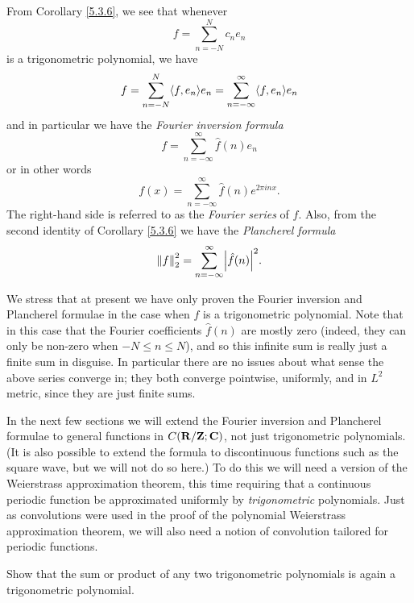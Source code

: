 \begin{additional corollary}\label{ac 5.3.1}
From Corollary \ref{5.3.6}, we see that whenever
\[
    f = \sum_{n = -N}^N c_n e_n
\]
is a trigonometric polynomial, we have
\[
    f = \sum_{n = -N}^N \inner*{f, e_n} e_n = \sum_{n = -\infty}^\infty \inner*{f, e_n} e_n
\]
and in particular we have the \emph{Fourier inversion formula}
\[
    f = \sum_{n = -\infty}^\infty \hat{f}(n) e_n
\]
or in other words
\[
    f(x) = \sum_{n = -\infty}^\infty \hat{f}(n) e^{2 \pi i n x}.
\]
The right-hand side is referred to as the \emph{Fourier series} of \(f\).
Also, from the second identity of Corollary \ref{5.3.6} we have the \emph{Plancherel formula}
\[
    \norm*{f}_2^2 = \sum_{n = -\infty}^\infty \abs{\hat{f}(n)}^2.
\]
\end{additional corollary}

\begin{remark}\label{5.3.8}
    We stress that at present we have only proven the Fourier inversion and Plancherel formulae in the case when \(f\) is a trigonometric polynomial.
    Note that in this case that the Fourier coefficients \(\hat{f}(n)\) are mostly zero (indeed, they can only be non-zero when \(-N \leq n \leq N\)), and so this infinite sum is really just a finite sum in disguise.
    In particular there are no issues about what sense the above series converge in;
    they both converge pointwise, uniformly, and in \(L^2\) metric, since they are just finite sums.
\end{remark}

\begin{note}
    In the next few sections we will extend the Fourier inversion and Plancherel formulae to general functions in \(C(\mathbf{R} / \mathbf{Z} ; \mathbf{C})\), not just trigonometric polynomials.
    (It is also possible to extend the formula to discontinuous functions such as the square wave, but we will not do so here.)
    To do this we will need a version of the Weierstrass approximation theorem, this time requiring that a continuous periodic function be approximated uniformly by \emph{trigonometric} polynomials.
    Just as convolutions were used in the proof of the polynomial Weierstrass approximation theorem, we will also need a notion of convolution tailored for periodic functions.
\end{note}

\exercisesection

\begin{exercise}\label{ex 5.3.1}
    Show that the sum or product of any two trigonometric polynomials is again a trigonometric polynomial.
\end{exercise}

